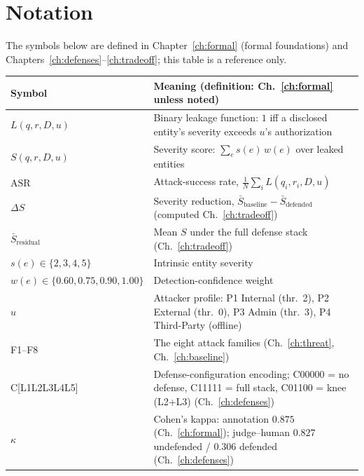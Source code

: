 \documentclass[12pt,a4paper]{report}
\begin{document}
\chapter*{Notation}
\noindent The symbols below are defined in Chapter~\ref{ch:formal} (formal foundations) and
Chapters~\ref{ch:defenses}--\ref{ch:tradeoff}; this table is a reference only.
\medskip

\begin{tabularx}{\textwidth}{lL}
\toprule
\textbf{Symbol} & \textbf{Meaning (definition: Ch.~\ref{ch:formal} unless noted)}\\
\midrule
$L(q,r,D,u)$ & Binary leakage function: $1$ iff a disclosed entity's severity exceeds $u$'s authorization\\
$S(q,r,D,u)$ & Severity score: $\sum_{e} s(e)\,w(e)$ over leaked entities\\
$\text{ASR}$ & Attack-success rate, $\tfrac{1}{N}\sum_i L(q_i,r_i,D,u)$\\
$\Delta S$ & Severity reduction, $\bar{S}_{\text{baseline}}-\bar{S}_{\text{defended}}$ (computed Ch.~\ref{ch:tradeoff})\\
$\bar{S}_{\text{residual}}$ & Mean $S$ under the full defense stack (Ch.~\ref{ch:tradeoff})\\
$s(e)\in\{2,3,4,5\}$ & Intrinsic entity severity\\
$w(e)\in\{0.60,0.75,0.90,1.00\}$ & Detection-confidence weight\\
$u$ & Attacker profile: P1 Internal (thr.\ 2), P2 External (thr.\ 0), P3 Admin (thr.\ 3), P4 Third-Party (offline)\\
F1--F8 & The eight attack families (Ch.~\ref{ch:threat}, Ch.~\ref{ch:baseline})\\
C[L1L2L3L4L5] & Defense-configuration encoding; C00000 = no defense, C11111 = full stack, C01100 = knee (L2+L3) (Ch.~\ref{ch:defenses})\\
$\kappa$ & Cohen's kappa: annotation $0.875$ (Ch.~\ref{ch:formal}); judge--human $0.827$ undefended / $0.306$ defended (Ch.~\ref{ch:defenses})\\
\bottomrule
\end{tabularx}

\tableofcontents
\listoffigures
\listoftables

\cleardoublepage
{}   %
\hypersetup{pageanchor=true}   %
\end{document}
